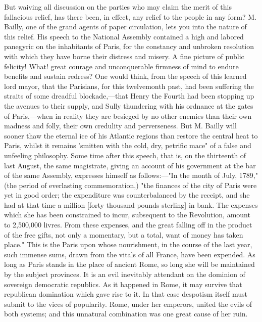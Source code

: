 But waiving all discussion on the parties who may claim the merit of this fallacious relief, has there been, in effect, any relief to the people in any form? M. Bailly, one of the grand agents of paper circulation, lets you into the nature of this relief. His speech to the National Assembly contained a high and labored panegyric on the inhabitants of Paris, for the constancy and unbroken resolution with which they have borne their distress and misery. A fine picture of public felicity! What! great courage and unconquerable firmness of mind to endure benefits and sustain redress? One would think, from the speech of this learned lord mayor, that the Parisians, for this twelvemonth past, had been suffering the straits of some dreadful blockade,—that Henry the Fourth had been stopping up the avenues to their supply, and Sully thundering with his ordnance at the gates of Paris,—when in reality they are besieged by no other enemies than their own madness and folly, their own credulity and perverseness. But M. Bailly will sooner thaw the eternal ice of his Atlantic regions than restore the central heat to Paris, whilst it remains 'smitten with the cold, dry, petrific mace" of a false and unfeeling philosophy. Some time after this speech, that is, on the thirteenth of last August, the same magistrate, giving an account of his government at the bar of the same Assembly, expresses himself as follows:—"In the month of July, 1789," (the period of everlasting commemoration,) "the finances of the city of Paris were yet in good order; the expenditure was counterbalanced by the receipt, and she had at that time a million [forty thousand pounds sterling] in bank. The expenses which she has been constrained to incur, subsequent to the Revolution, amount to 2,500,000 livres. From these expenses, and the great falling off in the product of the free gifts, not only a momentary, but a total, want of money has taken place." This is the Paris upon whose nourishment, in the course of the last year, such immense sums, drawn from the vitals of all France, have been expended. As long as Paris stands in the place of ancient Rome, so long she will be maintained by the subject provinces. It is an evil inevitably attendant on the dominion of sovereign democratic republics. As it happened in Rome, it may survive that republican domination which gave rise to it. In that case despotism itself must submit to the vices of popularity. Rome, under her emperors, united the evils of both systems; and this unnatural combination was one great cause of her ruin.

